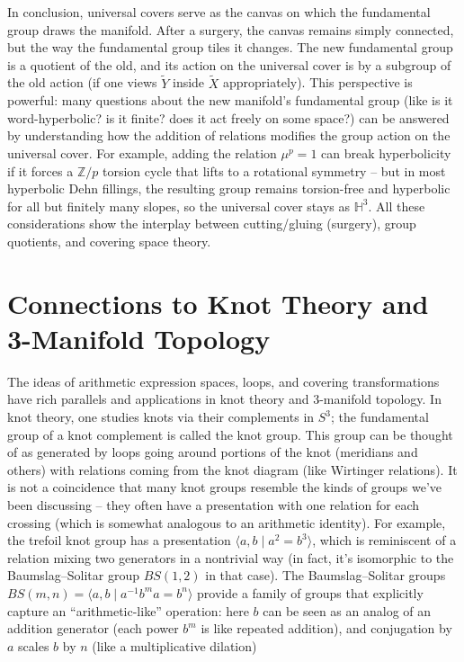 \documentclass[11pt]{article}
\theoremstyle{remark}
\begin{document}
In conclusion, universal covers serve as the canvas on which the fundamental group draws the manifold. After a surgery, the canvas remains simply connected, but the way the fundamental group tiles it changes. The new fundamental group is a quotient of the old, and its action on the universal cover is by a subgroup of the old action (if one views $\widetilde{Y}$ inside $\widetilde{X}$ appropriately). This perspective is powerful: many questions about the new manifold’s fundamental group (like is it word-hyperbolic? is it finite? does it act freely on some space?) can be answered by understanding how the addition of relations modifies the group action on the universal cover. For example, adding the relation $\mu^p=1$ can break hyperbolicity if it forces a $\mathbb{Z}/p$ torsion cycle that lifts to a rotational symmetry – but in most hyperbolic Dehn fillings, the resulting group remains torsion-free and hyperbolic for all but finitely many slopes, so the universal cover stays as $\mathbb{H}^3$. All these considerations show the interplay between cutting/gluing (surgery), group quotients, and covering space theory.

\section*{Connections to Knot Theory and 3-Manifold Topology}
The ideas of arithmetic expression spaces, loops, and covering transformations have rich parallels and applications in knot theory and 3-manifold topology. In knot theory, one studies knots via their complements in $S^3$; the fundamental group of a knot complement is called the knot group. This group can be thought of as generated by loops going around portions of the knot (meridians and others) with relations coming from the knot diagram (like Wirtinger relations). It is not a coincidence that many knot groups resemble the kinds of groups we’ve been discussing – they often have a presentation with one relation for each crossing (which is somewhat analogous to an arithmetic identity). For example, the trefoil knot group has a presentation $\langle a,b \mid a^2 = b^3 \rangle$, which is reminiscent of a relation mixing two generators in a nontrivial way (in fact, it’s isomorphic to the Baumslag–Solitar group $BS(1,2)$ in that case). The Baumslag–Solitar groups $BS(m,n)=\langle a,b \mid a^{-1}b^m a = b^n\rangle$ provide a family of groups that explicitly capture an “arithmetic-like” operation: here $b$ can be seen as an analog of an addition generator (each power $b^m$ is like repeated addition), and conjugation by $a$ scales $b$ by $n$ (like a multiplicative dilation)
\end{document}
